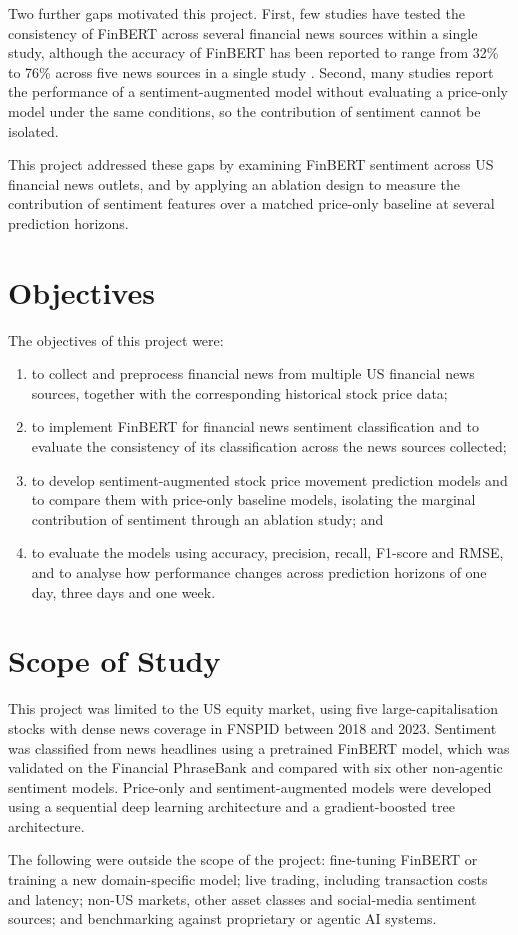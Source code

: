 Two further gaps motivated this project. First, few studies have tested the consistency of FinBERT across several financial news sources within a single study, although the accuracy of FinBERT has been reported to range from 32\% to 76\% across five news sources in a single study \parencite{liu2025enhancing}. Second, many studies report the performance of a sentiment-augmented model without evaluating a price-only model under the same conditions, so the contribution of sentiment cannot be isolated.

This project addressed these gaps by examining FinBERT sentiment across US financial news outlets, and by applying an ablation design to measure the contribution of sentiment features over a matched price-only baseline at several prediction horizons.

\section{Objectives}
The objectives of this project were:
\begin{enumerate}
\item to collect and preprocess financial news from multiple US financial news sources, together with the corresponding historical stock price data;
\item to implement FinBERT for financial news sentiment classification and to evaluate the consistency of its classification across the news sources collected;
\item to develop sentiment-augmented stock price movement prediction models and to compare them with price-only baseline models, isolating the marginal contribution of sentiment through an ablation study; and
\item to evaluate the models using accuracy, precision, recall, F1-score and RMSE, and to analyse how performance changes across prediction horizons of one day, three days and one week.
\end{enumerate}

\section{Scope of Study}
This project was limited to the US equity market, using five large-capitalisation stocks with dense news coverage in FNSPID between 2018 and 2023. Sentiment was classified from news headlines using a pretrained FinBERT model, which was validated on the Financial PhraseBank and compared with six other non-agentic sentiment models. Price-only and sentiment-augmented models were developed using a sequential deep learning architecture and a gradient-boosted tree architecture.

The following were outside the scope of the project: fine-tuning FinBERT or training a new domain-specific model; live trading, including transaction costs and latency; non-US markets, other asset classes and social-media sentiment sources; and benchmarking against proprietary or agentic AI systems.
